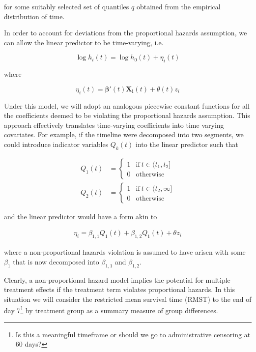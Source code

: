 \documentclass[a4paper]{article}
\begin{document}
for some suitably selected set of quantiles $q$ obtained from the empirical distribution of time.

In order to account for deviations from the proportional hazards assumption, we can allow the linear predictor to be time-varying, i.e. 

\begin{equation}
\log h_i(t) = \log h_0(t) + \eta_i(t)
\end{equation}

where

\begin{equation}
\eta_i(t) = \boldsymbol{\beta}'(t) \boldsymbol{X_i}(t) + \theta(t) z_i
\end{equation}

Under this model, we will adopt an analogous piecewise constant functions for all the coefficients deemed to be violating the proportional hazards assumption.
This approach effectively translates time-varying coefficients into time varying covariates.
For example, if the timeline were decomposed into two segments, we could introduce indicator variables $Q_k(t)$ into the linear predictor such that 

\begin{align*}
Q_1(t) &= \begin{cases}
      1 & \text{if}\ t \in (t_1, t_2] \\
      0 & \text{otherwise}
    \end{cases} \\
Q_2(t) &= \begin{cases}
      1 & \text{if}\ t \in (t_2, \infty] \\
      0 & \text{otherwise}
    \end{cases}    
\end{align*}

and the linear predictor would have a form akin to 

\begin{align*}
\eta_i = \beta_{1, 1} Q_1(t) + \beta_{1, 2} Q_1(t) + \theta z_i
\end{align*}

where a non-proportional hazards violation is assumed to have arisen with some $\beta_1$ that is now decomposed into $\beta_{1, 1}$ and $\beta_{1, 2}$.

Clearly, a non-proportional hazard model implies the potential for multiple treatment effects if the treatment term violates proportional hazards.
In this situation we will consider the restricted mean survival time (RMST) to the end of day 7\footnote{Is this a meaningful timeframe or should we go to administrative censoring at 60 days?} by treatment group as a summary measure of group differences.
\end{document}
